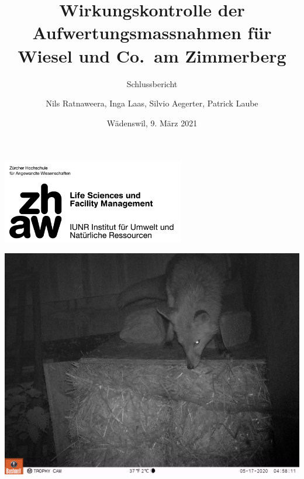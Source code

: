 \documentclass[
  oneside]{scrbook}
\title{Wirkungskontrolle der Aufwertungsmassnahmen für Wiesel und Co.~am Zimmerberg}
\subtitle{Schlussbericht}
\author{Nils Ratnaweera, Inga Laas, Silvio Aegerter, Patrick Laube}
\date{Wädenswil, 9. März 2021}
\begin{document}
\maketitle


\makeatletter
\begin{titlepage}

\thispagestyle{empty}
\includegraphics[width=0.6\textwidth]{images/zhaw_lsfm_iunr_schwarz.jpg}

\begin{center}

\includegraphics{images/Fuchs_2_Str_60_WK04.JPG}

\vspace{10pt}

{\huge \@title}

\vspace{30pt}

% 



\end{center}



\begin{flushleft}

\begin{minipage}{21cm}
\vspace{10cm}



\end{minipage}
\end{flushleft}
\end{titlepage}
\end{document}
